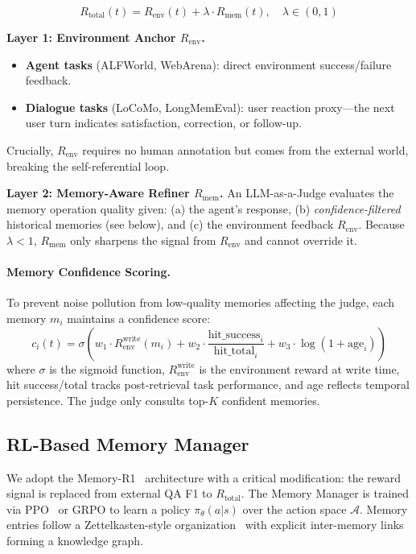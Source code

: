 \documentclass{article}
\newcommand{\renv}{R_{\mathrm{env}}}
\newcommand{\rmem}{R_{\mathrm{mem}}}
\newcommand{\rtotal}{R_{\mathrm{total}}}
\begin{document}
\begin{equation}
\rtotal(t) = \renv(t) + \lambda \cdot \rmem(t), \quad \lambda \in (0, 1)
\end{equation}

\noindent\textbf{Layer 1: Environment Anchor $\renv$.}
\begin{itemize}[nosep, leftmargin=*]
    \item \textbf{Agent tasks} (ALFWorld, WebArena): direct environment success/failure feedback.
    \item \textbf{Dialogue tasks} (LoCoMo, LongMemEval): user reaction proxy---the next user turn indicates satisfaction, correction, or follow-up.
\end{itemize}
Crucially, $\renv$ requires no human annotation but comes from the external world, breaking the self-referential loop.

\noindent\textbf{Layer 2: Memory-Aware Refiner $\rmem$.}
An LLM-as-a-Judge evaluates the memory operation quality given: (a) the agent's response, (b) \emph{confidence-filtered} historical memories (see below), and (c) the environment feedback $\renv$. Because $\lambda < 1$, $\rmem$ only sharpens the signal from $\renv$ and cannot override it.

\paragraph{Memory Confidence Scoring.}
To prevent noise pollution from low-quality memories affecting the judge, each memory $m_i$ maintains a confidence score:
\begin{equation}
c_i(t) = \sigma\left(w_1 \cdot R_{\mathrm{env}}^{\mathrm{write}}(m_i) + w_2 \cdot \frac{\text{hit\_success}_i}{\text{hit\_total}_i} + w_3 \cdot \log(1 + \text{age}_i)\right)
\label{eq:confidence}
\end{equation}
where $\sigma$ is the sigmoid function, $R_{\mathrm{env}}^{\mathrm{write}}$ is the environment reward at write time, hit success/total tracks post-retrieval task performance, and age reflects temporal persistence. The judge only consults top-$K$ confident memories.

\subsection{RL-Based Memory Manager}
\label{sec:manager}

We adopt the Memory-R1~\citep{chen2025memoryr1} architecture with a critical modification: the reward signal is replaced from external QA F1 to $\rtotal$. The Memory Manager is trained via PPO~\citep{schulman2017ppo} or GRPO to learn a policy $\pi_\theta(a | s)$ over the action space $\mathcal{A}$. Memory entries follow a Zettelkasten-style organization~\citep{xu2025amem} with explicit inter-memory links forming a knowledge graph.
\end{document}

